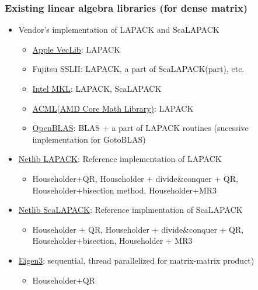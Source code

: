 \begin{frame}
  \frametitle{Existing linear algebra libraries (for dense matrix)}
  \begin{itemize}
  \item Vendor's implementation of LAPACK and ScaLAPACK
    \begin{itemize}
    \item \href{https://developer.apple.com/library/mac/documentation/Performance/Conceptual/vecLib/Reference/reference.html}{Apple VecLib}: LAPACK
    \item Fujitsu SSLII: LAPACK, a part of ScaLAPACK(part), etc.
    \item \href{https://software.intel.com/en-us/mkl_11.1_ref}{Intel MKL}: LAPACK, ScaLAPACK
    \item
      \href{http://developer.amd.com/tools-and-sdks/cpu-development/amd-core-math-library-acml/}{ACML(AMD
        Core Math Library)}: LAPACK
    \item \href{http://www.openblas.net}{OpenBLAS}: BLAS + a part of LAPACK routines (sucessive implementation for GotoBLAS)

    \end{itemize}
  \item \href{http://www.netlib.org/lapack/}{Netlib LAPACK}: Reference implementation of LAPACK
    \begin{itemize}
      \item Householder+QR, Householder + divide\&conquer + QR, Householder+bisection method, Householder+MR3
    \end{itemize}
  \item \href{http://www.netlib.org/scalapack/}{Netlib ScaLAPACK}: Reference implmentation of ScaLAPACK
    \begin{itemize}
      \item Householder + QR, Householder + divide\&conquer + QR, Householder+bisection, Householder + MR3
    \end{itemize}
  \item \href{http://eigen.tuxfamily.org/}{Eigen3}: sequential, thread parallelized for matrix-matrix product)
    \begin{itemize}
      \item Householder+QR
    \end{itemize}
  \end{itemize}
\end{frame}

